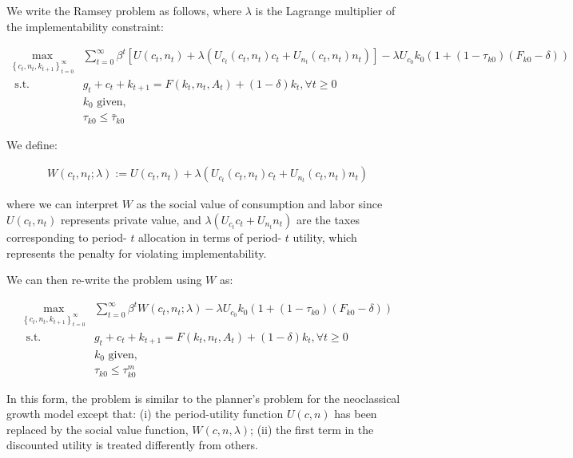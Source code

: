 \documentclass[10pt]{article}
\begin{document}
We write the Ramsey problem as follows, where 
$\lambda$ is the Lagrange multiplier of the 
implementability constraint:

\begin{align}
    \max _{\left\{c_t, n_t, k_{t+1}\right\}_{t=0}^{\infty}} &\sum_{t=0}^{\infty} \beta^t\left[U\left(c_t, n_t\right)+\lambda\left(U_{c_t}\left(c_t, n_t\right) c_t+U_{n_t}\left(c_t, n_t\right) n_t\right)\right]-\lambda U_{c_0} k_0\left(1+\left(1-\tau_{k 0}\right)\left(F_{k 0}-\delta\right)\right) \\
    \text { s.t. } \quad & g_t+c_t+k_{t+1}=F\left(k_t, n_t, A_t\right)+(1-\delta) k_t, \forall t \geq 0 \\
    &k_0 \text { given, } \\
    &\tau_{k 0} \leq \bar{\tau}_{k 0}
\end{align}

We define:

\begin{align}
    W\left(c_t, n_t ; \lambda\right):=U\left(c_t, n_t\right)+\lambda\left(U_{c_t}\left(c_t, n_t\right) c_t+U_{n_t}\left(c_t, n_t\right) n_t\right)
\end{align}

where we can interpret 
$W$ as the social value of consumption and labor 
since $U\left(c_t, n_t\right)$ represents
private value, and $\lambda\left(U_{c_t} c_t+U_{n_t} n_t\right)$ are the taxes corresponding to period- $t$ allocation in terms of period- $t$ utility, which represents the penalty for violating implementability.

We can then re-write the problem using $W$ as:

\begin{align}
    \max _{\left\{c_t, n_t, k_{t+1}\right\}_{t=0}^{\infty}} & \sum_{t=0}^{\infty} \beta^t W\left(c_t, n_t ; \lambda\right)-\lambda U_{c_0} k_0\left(1+\left(1-\tau_{k 0}\right)\left(F_{k 0}-\delta\right)\right) \\
    \text { s.t. } & g_t+c_t+k_{t+1}=F\left(k_t, n_t, A_t\right)+(1-\delta) k_t, \forall t \geq 0 \\
    & k_0 \text { given, } \\
    & \tau_{k 0} \leq \tau_{k 0}^m
\end{align}

In this form, the problem is similar to the planner's problem for the neoclassical growth model except that: (i) the period-utility function $U(c, n)$ has been replaced by the social value function, $W(c, n, \lambda)$; (ii) the first term in the discounted utility is treated differently from others.
\end{document}
